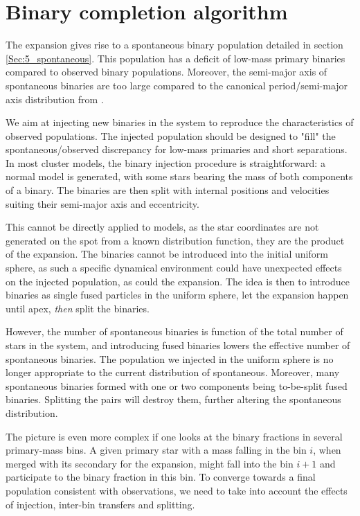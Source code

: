 \chapter{Binary completion algorithm}
\label{App:completion}

The \HubLem expansion gives rise to a spontaneous binary population detailed in section \ref{Sec:5_spontaneous}. This population has a deficit of low-mass primary binaries compared to observed binary populations. Moreover, the semi-major axis of spontaneous binaries are too large compared to the canonical period/semi-major axis distribution from \cite{Raghavan2010}.

We aim at injecting new binaries in the system to reproduce the characteristics of observed populations. The injected population should be designed to "fill" the spontaneous/observed discrepancy for low-mass primaries and short separations. In most cluster models, the binary injection procedure is straightforward: a normal model is generated, with some stars bearing the mass of both components of a binary. The binaries are then split with internal positions and velocities suiting their semi-major axis and eccentricity. 

This cannot be directly applied to \HubLem models, as the star coordinates are not generated on the spot from a known distribution function, they are the product of the expansion. The binaries cannot be introduced into the initial uniform sphere, as such a specific dynamical environment could have unexpected effects on the injected population, as could the expansion. The idea is then to introduce binaries as single fused particles in the uniform sphere, let the expansion happen until apex, \textit{then} split the binaries.

However, the number of spontaneous binaries is function of the total number of stars in the system, and introducing fused binaries lowers the effective number of spontaneous binaries. The population we injected in the uniform sphere is no longer appropriate to the current distribution of spontaneous. Moreover, many spontaneous binaries formed with one or two components being to-be-split fused binaries. Splitting the pairs will destroy them, further altering the spontaneous distribution.

The picture is even more complex if one looks at the binary fractions in several primary-mass bins. A given primary star with a mass falling in the bin $i$, when merged with its secondary for the expansion, might fall into the bin $i+1$ and participate to the binary fraction in this bin. To converge towards a final population consistent with observations, we need to take into account the effects of injection, inter-bin transfers and splitting.

